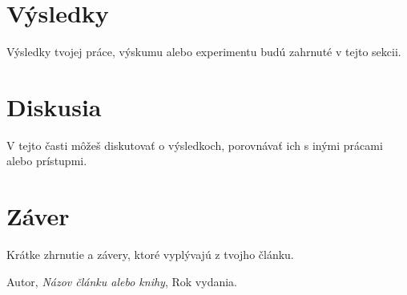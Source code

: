 \documentclass[a4paper,12pt]{article}
\begin{document}
\section{Výsledky}
Výsledky tvojej práce, výskumu alebo experimentu budú zahrnuté v tejto sekcii.

\section{Diskusia}
V tejto časti môžeš diskutovať o výsledkoch, porovnávať ich s inými prácami alebo prístupmi.

\section{Záver}
Krátke zhrnutie a závery, ktoré vyplývajú z tvojho článku.

\begin{thebibliography}{9}
     Autor, \textit{Názov článku alebo knihy}, Rok vydania.
\end{thebibliography}
\end{document}
